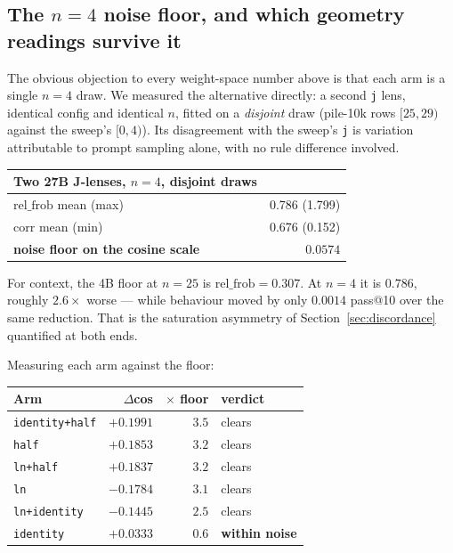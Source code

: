 \documentclass[11pt,a4paper]{article}
\newcommand{\jlens}{J\nobreakdash-lens}
\newcommand{\cfg}[1]{\texttt{#1}}
\begin{document}
\subsection{The $n=4$ noise floor, and which geometry readings survive it}
\label{sec:noisefloor}

The obvious objection to every weight-space number above is that each arm is a single
$n=4$ draw. We measured the alternative directly: a second \cfg{j} lens, identical
config and identical $n$, fitted on a \emph{disjoint} draw (pile-10k rows $[25,29)$
against the sweep's $[0,4)$). Its disagreement with the sweep's \cfg{j} is variation
attributable to prompt sampling alone, with no rule difference involved.

\begin{center}
\begin{tabular}{@{}lr@{}}
\toprule
\textbf{Two 27B \jlens{}es, $n=4$, disjoint draws} & \\
\midrule
$\mathrm{rel\_frob}$ mean (max)              & 0.786 (1.799) \\
$\mathrm{corr}$ mean (min)                   & 0.676 (0.152) \\
\textbf{noise floor on the cosine scale}     & $\mathbf{0.0574}$ \\
\bottomrule
\end{tabular}
\end{center}

\noindent
For context, the 4B floor at $n=25$ is $\mathrm{rel\_frob} = 0.307$. At $n=4$ it is
$0.786$, roughly $2.6\times$ worse --- while behaviour moved by only $0.0014$ pass@10
over the same reduction. That is the saturation asymmetry of
Section~\ref{sec:discordance} quantified at both ends.

Measuring each arm against the floor:

\begin{center}
\begin{tabular}{@{}lrrl@{}}
\toprule
\textbf{Arm} & \textbf{$\Delta$cos} & \textbf{$\times$ floor} & \textbf{verdict} \\
\midrule
\cfg{identity+half} & $+0.1991$ & $3.5$ & clears \\
\cfg{half}          & $+0.1853$ & $3.2$ & clears \\
\cfg{ln+half}       & $+0.1837$ & $3.2$ & clears \\
\cfg{ln}            & $-0.1784$ & $3.1$ & clears \\
\cfg{ln+identity}   & $-0.1445$ & $2.5$ & clears \\
\cfg{identity}      & $+0.0333$ & $0.6$ & \textbf{within noise} \\
\bottomrule
\end{tabular}
\end{center}
\end{document}
